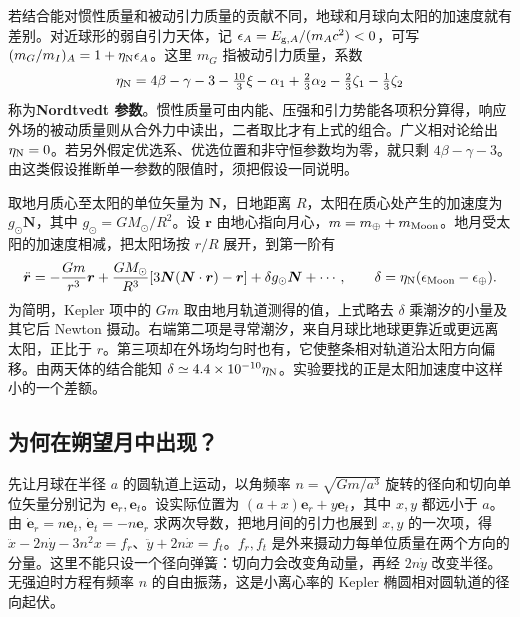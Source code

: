 若结合能对惯性质量和被动引力质量的贡献不同，地球和月球向太阳的加速度就有差别。对近球形的弱自引力天体，记 $\epsilon_A=E_{{\rm g},A}/(m_Ac^2)<0$，可写 $(m_G/m_I)_A=1+\eta_{\rm N}\epsilon_A$。这里 $m_G$ 指被动引力质量，系数
\[
    \eta_{\rm N}=4\beta-\gamma-3-\tfrac{10}{3}\xi-\alpha_1
                   +\tfrac{2}{3}\alpha_2-\tfrac{2}{3}\zeta_1-\tfrac{1}{3}\zeta_2
\]
称为\textbf{Nordtvedt 参数}。惯性质量可由内能、压强和引力势能各项积分算得，响应外场的被动质量则从合外力中读出，二者取比才有上式的组合。广义相对论给出 $\eta_{\rm N}=0$。若另外假定优选系、优选位置和非守恒参数均为零，就只剩 $4\beta-\gamma-3$。由这类假设推断单一参数的限值时，须把假设一同说明。

取地月质心至太阳的单位矢量为 $\bm N$，日地距离 $R$，太阳在质心处产生的加速度为 $g_\odot\bm N$，其中 $g_\odot=GM_\odot/R^2$。设 $\bm r$ 由地心指向月心，$m=m_\oplus+m_{\rm Moon}$。地月受太阳的加速度相减，把太阳场按 $r/R$ 展开，到第一阶有
\[
    \ddot{\bm r}=-\frac{Gm}{r^3}\bm r
         +\frac{GM_\odot}{R^3}
              [3\bm N(\bm N\cdot\bm r)-\bm r]
         +\delta g_\odot\bm N+\cdots ,\qquad
    \delta=\eta_{\rm N}(\epsilon_{\rm Moon}-\epsilon_\oplus).
\]
为简明，Kepler 项中的 $Gm$ 取由地月轨道测得的值，上式略去 $\delta$ 乘潮汐的小量及其它后 Newton 摄动。右端第二项是寻常潮汐，来自月球比地球更靠近或更远离太阳，正比于 $r$。第三项却在外场均匀时也有，它使整条相对轨道沿太阳方向偏移。由两天体的结合能知 $\delta\simeq4.4\times10^{-10}\eta_{\rm N}$。实验要找的正是太阳加速度中这样小的一个差额。

\subsection{为何在朔望月中出现？}

先让月球在半径 $a$ 的圆轨道上运动，以角频率 $n=\sqrt{Gm/a^3}$ 旋转的径向和切向单位矢量分别记为 $\bm e_r,\bm e_t$。设实际位置为 $(a+x)\bm e_r+y\bm e_t$，其中 $x,y$ 都远小于 $a$。由 $\dot{\bm e}_r=n\bm e_t,\,\dot{\bm e}_t=-n\bm e_r$ 求两次导数，把地月间的引力也展到 $x,y$ 的一次项，得 $\ddot x-2n\dot y-3n^2x=f_r$、$\ddot y+2n\dot x=f_t$。$f_r,f_t$ 是外来摄动力每单位质量在两个方向的分量。这里不能只设一个径向弹簧：切向力会改变角动量，再经 $2n\dot y$ 改变半径。无强迫时方程有频率 $n$ 的自由振荡，这是小离心率的 Kepler 椭圆相对圆轨道的径向起伏。

